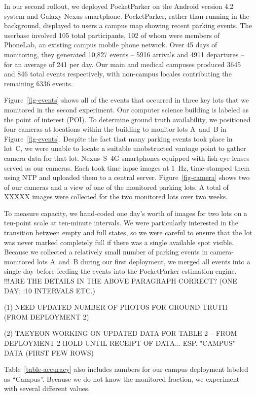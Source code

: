 In our second rollout, we deployed PocketParker on the Android version 4.2
system and Galaxy Nexus smartphone.  PocketParker, rather than running in the
background, displayed to users a campus map showing recent parking events.
The userbase involved 105 total participants, 102 of whom were members of
PhoneLab, an existing campus mobile phone network.  Over 45 days of
monitoring, they generated 10,827 events -- 5916 arrivals and 4911 departures
-- for an average of 241 per day.  Our main and medical campuses produced 3645
and 846 total events respectively, with non-campus locales contributing the
remaining 6336 events.

Figure~\ref{fig-events} shows all of the events that occurred in three key
lots that we monitored in the second experiment. Our computer science
building is labeled as the point of interest (POI). To determine ground
truth availability, we positioned four cameras at locations within the
building to monitor lots A~and~B in Figure~\ref{fig-events}.  Despite the fact
that many parking events took place in lot~C, we were unable to locate a
suitable unobstructed vantage point to gather camera data for that lot.
Nexus~S~4G smartphones equipped with fish-eye lenses served as our cameras.
Each took time lapse images at 1~Hz, time-stamped them using NTP and uploaded
them to a central server. Figure~\ref{fig-camera} shows two of our cameras
and a view of one of the monitored parking lots. A total of XXXXX images
were collected for the two monitored lots over two weeks.

To measure capacity, we hand-coded one day's worth of images for two lots on
a ten-point scale at ten-minute intervals. We were particularly interested
in the transition between empty and full states, so we were careful to ensure
that the lot was never marked completely full if there was a single available
spot visible. Because we collected a relatively small number of parking events
in camera-monitored lots A~and~B during our first deployment, we merged all
events into a single day before feeding the events into the PocketParker
estimation engine.
!!!ARE THE DETAILS IN THE ABOVE PARAGRAPH CORRECT?  (ONE DAY; :10 INTERVALS ETC.)

(1)  NEED UPDATED NUMBER OF PHOTOS FOR GROUND TRUTH (FROM DEPLOYMENT 2)

(2)  TAEYEON WORKING ON UPDATED DATA FOR TABLE 2 -- FROM DEPLOYMENT 2
HOLD UNTIL RECEIPT OF DATA...  ESP. "CAMPUS" DATA (FIRST FEW ROWS)

Table~\ref{table-accuracy} also includes numbers for our campus deployment
labeled as ``Campus''. Because we do not know the monitored fraction, we
experiment with several different values.

